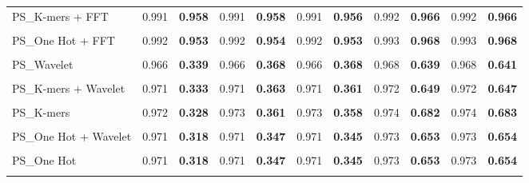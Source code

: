 \begin{table*}[htbp]
\begin{tabular}{lcccccccccc}
PS\_K-mers + FFT & 0.991 & \textbf{0.958} & 0.991 & \textbf{0.958} & 0.991 & \textbf{0.956} & 0.992 & \textbf{0.966} & 0.992 & \textbf{0.966} \\\\
PS\_One Hot + FFT & 0.992 & \textbf{0.953} & 0.992 & \textbf{0.954} & 0.992 & \textbf{0.953} & 0.993 & \textbf{0.968} & 0.993 & \textbf{0.968} \\\\
PS\_Wavelet & 0.966 & \textbf{0.339} & 0.966 & \textbf{0.368} & 0.966 & \textbf{0.368} & 0.968 & \textbf{0.639} & 0.968 & \textbf{0.641} \\\\
PS\_K-mers + Wavelet & 0.971 & \textbf{0.333} & 0.971 & \textbf{0.363} & 0.971 & \textbf{0.361} & 0.972 & \textbf{0.649} & 0.972 & \textbf{0.647} \\\\
PS\_K-mers & 0.972 & \textbf{0.328} & 0.973 & \textbf{0.361} & 0.973 & \textbf{0.358} & 0.974 & \textbf{0.682} & 0.974 & \textbf{0.683} \\\\
PS\_One Hot + Wavelet & 0.971 & \textbf{0.318} & 0.971 & \textbf{0.347} & 0.971 & \textbf{0.345} & 0.973 & \textbf{0.653} & 0.973 & \textbf{0.654} \\\\
PS\_One Hot & 0.971 & \textbf{0.318} & 0.971 & \textbf{0.347} & 0.971 & \textbf{0.345} & 0.973 & \textbf{0.653} & 0.973 & \textbf{0.654} \\\\
\bottomrule
\end{tabular}
\end{table*}